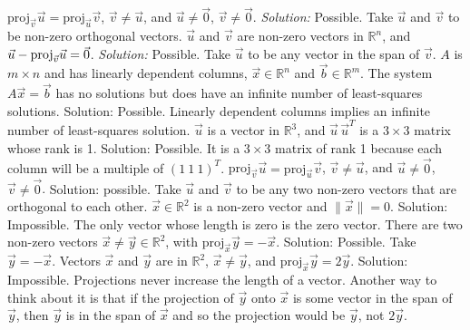 \fi   
\ifnum {}    
    proj$_{\vec v} \vec u = \text{proj}_{\vec u} \vec v$, $\vec v \ne \vec u$, and $\vec u\ne \vec 0$, $\vec v \ne \vec 0$.
    \ifnum {} {\color{DarkBlue} \textit{Solution:  } Possible. Take $\vec u$ and $\vec v$ to be non-zero orthogonal vectors.  } \fi
\fi    
\ifnum {}      
    $\vec u$ and $\vec v$ are non-zero vectors in $\mathbb R^n$, and $\vec u - \text{proj}_{\vec v} \vec u = \vec 0$.
    \ifnum {} {\color{DarkBlue} \textit{Solution:  } Possible. Take $\vec u$ to be any vector in the span of $\vec v$. } \fi
\fi        
\ifnum {}  
     $A$ is $m\times n$ and has linearly dependent columns, $\vec x \in \mathbb R^n$ and $\vec b \in \mathbb R^m$. The system $A\vec x = \vec b$ has no solutions but does have an infinite number of least-squares solutions.
    \ifnum {} {\color{DarkBlue} Solution: Possible. Linearly dependent columns implies  an infinite number of least-squares solution. } \fi
\fi      
\ifnum {}
    $\vec u$ is a vector in $\mathbb R^3$, and $\vec u \,\vec u^T$ is a $3 \times 3$ matrix whose rank is 1.
    \ifnum {} {\color{DarkBlue} Solution:  Possible. It is a $3\times 3$ matrix of rank 1 because each column will be a multiple of $(1 \ 1 \ 1)^T$.  
    } \fi
\fi      
\ifnum {}
    \setlength{\extrarowheight}{0.00cm} 
      proj$_{\vec v} \vec u = \text{proj}_{\vec u} \vec v$, $\vec v \ne \vec u$, and $\vec u\ne \vec 0$, $\vec v \ne \vec 0$.
    \ifnum {} {\color{DarkBlue} Solution:  possible. Take $\vec u$ and $\vec v$ to be any two non-zero vectors that are orthogonal to each other. 
    } \fi
\fi      
\ifnum {}
    \setlength{\extrarowheight}{0.00cm} 
    $\vec x \in \mathbb R^2$ is a non-zero vector and $\|\vec x\| = 0$.     \ifnum {} {\color{DarkBlue} Solution:  Impossible. The only vector whose length is zero is the zero vector. 
    } \fi
\fi      
\ifnum {}
    \setlength{\extrarowheight}{0.00cm}  
    There are two non-zero vectors $\vec x \not= \vec y\in \mathbb R^2$, with 
    $ \text{proj}_{\vec x} \vec y = - \vec x$. 
    \ifnum {} {\color{DarkBlue} Solution:  Possible. Take $\vec y= - \vec x$.
    } \fi
\fi      
\ifnum {}
    \setlength{\extrarowheight}{0.00cm} 
      Vectors $\vec x$ and $\vec y$ are  in $\mathbb R^2$, $\vec x \not= \vec y$, and $ \text{proj}_{\vec x} \vec y = 2\vec y$. 
    \ifnum {} {\color{DarkBlue} Solution:  Impossible. Projections never increase the length of a vector. Another way to think about it is that if the projection of $\vec y$ onto $\vec x$ is some vector in the span of $\vec y$, then $\vec y$ is in the span of $\vec x$ and so the projection would be $\vec y$, not $2\vec y$.  
    } \fi
